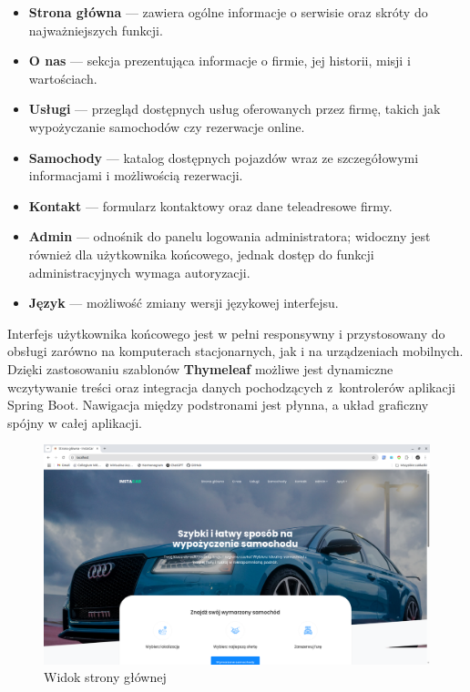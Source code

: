 \documentclass[12pt]{article}
\begin{document}
	\begin{itemize}
		\item \textbf{Strona główna} --- zawiera ogólne informacje o serwisie oraz skróty do najważniejszych funkcji.
		\item \textbf{O nas} --- sekcja prezentująca informacje o firmie, jej historii, misji i wartościach.
		\item \textbf{Usługi} --- przegląd dostępnych usług oferowanych przez firmę, takich jak wypożyczanie samochodów czy rezerwacje online.
		\item \textbf{Samochody} --- katalog dostępnych pojazdów wraz ze szczegółowymi informacjami i możliwością rezerwacji.
		\item \textbf{Kontakt} --- formularz kontaktowy oraz dane teleadresowe firmy.
		\item \textbf{Admin} --- odnośnik do panelu logowania administratora; widoczny jest również dla użytkownika końcowego, jednak dostęp do funkcji administracyjnych wymaga autoryzacji.
		\item \textbf{Język} --- możliwość zmiany wersji językowej interfejsu.
	\end{itemize}
	Interfejs użytkownika końcowego jest w pełni responsywny i przystosowany do obsługi zarówno na komputerach stacjonarnych, jak i na urządzeniach mobilnych. Dzięki zastosowaniu szablonów \textbf{Thymeleaf} możliwe jest dynamiczne wczytywanie treści oraz integracja danych pochodzących z~kontrolerów aplikacji Spring Boot. Nawigacja między podstronami jest płynna, a układ graficzny spójny w całej aplikacji.
	
	\begin{figure}[H]
		\centering
		\includegraphics[width=1\linewidth]{homepage}
		\caption{Widok strony głównej}
		\label{fig:homepage}
	\end{figure}
	
\end{document}
